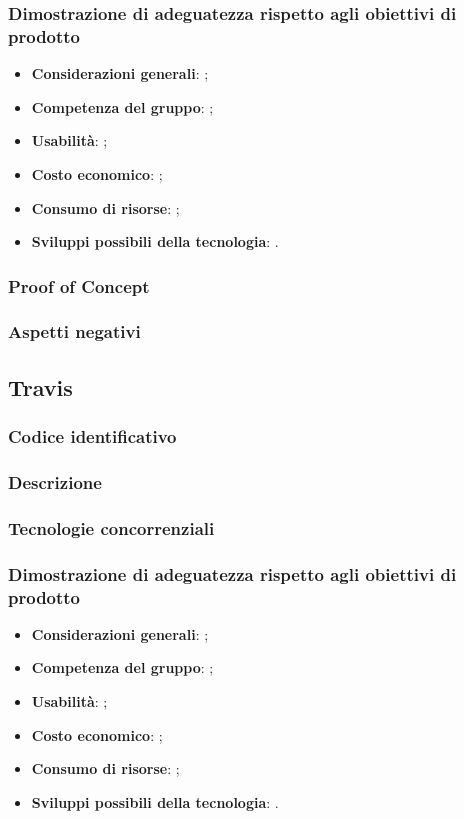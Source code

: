 \documentclass[./../Technology Baseline.tex]{subfiles}
\begin{document}
\subsubsection{Dimostrazione di adeguatezza rispetto agli obiettivi di prodotto}
\begin{itemize}
	\item \textbf{Considerazioni generali}: ;
	\item \textbf{Competenza del gruppo}: ;
	\item \textbf{Usabilità}: ;
	\item \textbf{Costo economico}: ;
	\item \textbf{Consumo di risorse}: ;
	\item \textbf{Sviluppi possibili della tecnologia}: .
\end{itemize}
\subsubsection{Proof of Concept}
\subsubsection{Aspetti negativi}

\subsection{Travis}

\subsubsection{Codice identificativo}
\subsubsection{Descrizione}
\subsubsection{Tecnologie concorrenziali}
\subsubsection{Dimostrazione di adeguatezza rispetto agli obiettivi di prodotto}
\begin{itemize}
	\item \textbf{Considerazioni generali}: ;
	\item \textbf{Competenza del gruppo}: ;
	\item \textbf{Usabilità}: ;
	\item \textbf{Costo economico}: ;
	\item \textbf{Consumo di risorse}: ;
	\item \textbf{Sviluppi possibili della tecnologia}: .
\end{itemize}
\end{document}
